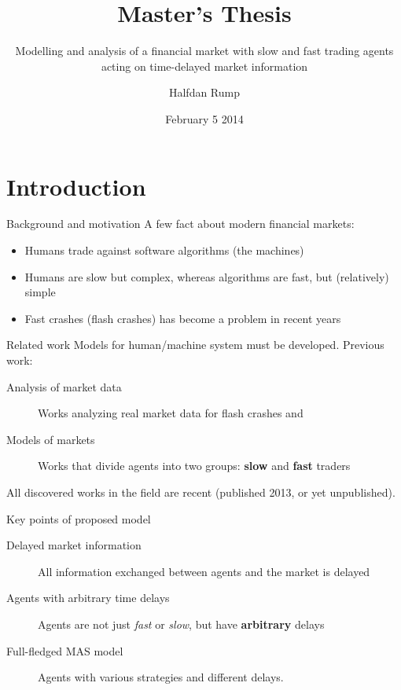 \documentclass[14pt]{beamer}
\subtitle{Modelling and analysis of a financial market with slow and fast trading agents acting on time-delayed market information}
\title{Master's Thesis}
\author{Halfdan Rump}
\date{February 5 2014} %
\institute{Waseda GRS-FSE} %
\begin{document}
\begin{frame}
  \titlepage
\end{frame}






\section{Introduction}
\begin{frame}
\tableofcontents[currentsection]
\end{frame}

\begin{frame}{Background and motivation}
A few fact about modern financial markets:
\begin{itemize}
	\item Humans trade against software algorithms (the machines) 
	\item Humans are slow but complex, whereas algorithms are fast, but (relatively) simple
	\item Fast crashes (flash crashes) has become a problem in recent years
\end{itemize}
\end{frame}

\begin{frame}{Related work}
Models for human/machine system must be developed. Previous work:
\begin{description}
	\item[Analysis of market data] Works analyzing real market data for flash crashes and
	\item[Models of markets] Works that divide agents into two groups: \textbf{slow} and \textbf{fast} traders
\end{description}
All discovered works in the field are recent (published 2013, or yet unpublished).
\end{frame}

\begin{frame}{Key points of proposed model}
\begin{description}
\item[Delayed market information] All information exchanged between agents and the market is delayed
\item[Agents with arbitrary time delays] Agents are not just \textit{fast} or \textit{slow}, but have \textbf{arbitrary} delays
\item[Full-fledged MAS model] Agents with various strategies and different delays.
\end{description}
\end{frame}
\end{document}
